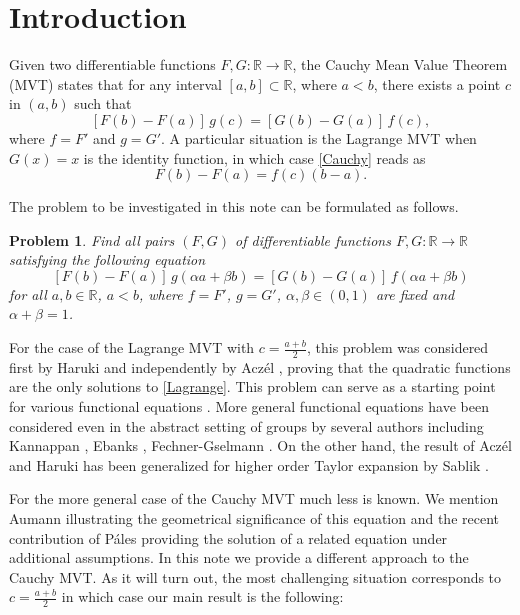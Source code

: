 \documentclass{birkjour}
\newtheorem{problem}[theorem]{Problem}
\begin{document}
\section{Introduction}
Given two differentiable functions $F,G:{{\mathbb R}} \to {{\mathbb R}}$, the Cauchy Mean Value Theorem (MVT) states that for any interval $[a,b]\subset {{\mathbb R}}$, where $a<b$, there exists a point $c$ in $(a,b)$ such that 
\begin{equation} \label{Cauchy}
[F(b)-F(a)]\,g(c) = [G(b)-G(a)]\,f(c),
\end{equation}
where $f= F'$ and $g=G'$. A particular situation is the Lagrange MVT when $G(x)=x$ is the identity function, 
in which case \eqref{Cauchy} reads as
\begin{equation} \label{Lagrange}
F(b)-F(a) = f(c)(b-a).
\end{equation}

The problem to be investigated in this note can be formulated as follows.
\begin{problem}
\label{the-problem}
Find all pairs $(F,G)$ of differentiable functions $F, G :{{\mathbb R}}\to{{\mathbb R}}$ satisfying the following equation 
\begin{equation}
\label{eqn:cauchy.gen}
[F(b)-F(a)] \, g(\alpha a+\beta b) = [G(b)-G(a)] \, f(\alpha a+\beta b)  
\end{equation}
for all $a,b \in {{\mathbb R}}$, $a<b$, where $f=F'$, $g=G'$, $\alpha, \beta\in (0,1)$ are fixed and $\alpha+\beta=1$.
\end{problem}

For the case of the Lagrange MVT with $c=\frac{a+b}{2}$, this problem was considered first by Haruki \cite{Haruki} and independently by Acz\'el \cite{Aczel}, proving that the quadratic functions are the only solutions to \eqref{Lagrange}. This problem can serve as a starting point for various functional equations \cite{Sahoo-Riedel}. More general functional equations have been considered 
even in the abstract setting of groups by several authors including Kannappan \cite{Kannappan}, Ebanks \cite{Ebanks}, Fechner-Gselmann \cite{Fechner-Gselmann}. On the other hand, the result of Acz\'el and Haruki has been generalized for higher order Taylor expansion by Sablik \cite{Sablik}. 

For the more general case of the Cauchy MVT much less is known. We mention Aumann \cite{Aumann} illustrating the geometrical significance of this equation and the recent contribution of P\'ales \cite{Pales} providing the solution of a related equation under additional assumptions. In this note we provide a different approach to the Cauchy MVT.
 As it will turn out, the most challenging situation corresponds to $c=\frac{a+b}{2}$ in which case our main result is the following:
\end{document}
